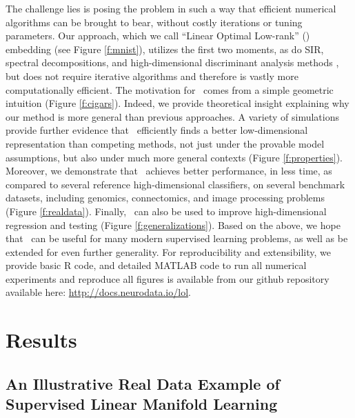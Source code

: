 \documentclass[10pt]{article}
\begin{document}
The challenge lies is posing the problem in such a way that efficient numerical algorithms can be brought to bear, without costly iterations or tuning parameters.  Our approach, which we call ``Linear Optimal Low-rank'' (\Lol) embedding (see Figure \ref{f:mnist}), utilizes the first two moments, as do SIR, spectral decompositions, and high-dimensional discriminant analysis methods \cite{Bouveyron2007}, but does not require iterative algorithms and therefore is vastly more computationally efficient.  The motivation for \Lol~comes from a simple geometric intuition (Figure \ref{f:cigars}).  Indeed, we provide  theoretical insight explaining why our method is more general than previous approaches.  A variety of simulations provide further evidence that \Lol~efficiently finds a better low-dimensional representation than competing methods, not just under the provable model assumptions, but also under much more general contexts (Figure \ref{f:properties}).  Moreover, we demonstrate that \Lol~achieves better performance, in less time, as compared to several reference high-dimensional classifiers, on several benchmark datasets, including genomics, connectomics, and image processing problems (Figure \ref{f:realdata}). 
Finally, \Lol~can also be used to improve high-dimensional regression and testing (Figure \ref{f:generalizations}).  
Based on the above, we hope that  \Lol~can be useful for many modern supervised learning problems, as well as be extended for even further generality. For reproducibility and extensibility, we provide basic R code, and detailed MATLAB code to run all numerical experiments and reproduce all figures is available from our github repository available here: \url{http://docs.neurodata.io/lol}. 


\section*{Results}

\subsection*{An Illustrative Real Data Example of Supervised Linear Manifold Learning}
\end{document}
